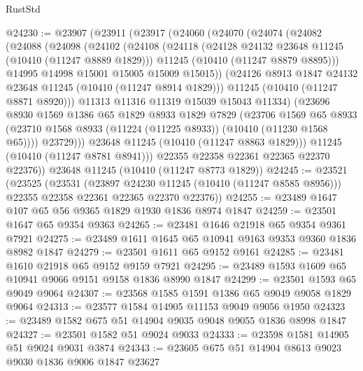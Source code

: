 \begin{lexlean}{RustStd}
\begin{coremodule}
@24230 := @23907
    (@23911
      (@23917
        (@24060
          (@24070
            (@24074
              (@24082
                (@24088
                  (@24098
                    (@24102
                      (@24108
                        (@24118
                          (@24128 @24132 @23648 @11245 (@10410 (@11247 @8889 @1829)))
                          @11245
                          (@10410 (@11247 @8879 @8895)))
                        @14995
                        @14998
                        @15001
                        @15005
                        @15009
                        @15015))
                    (@24126 @8913 @1847 @24132 @23648 @11245 (@10410 (@11247 @8914 @1829)))
                    @11245
                    (@10410 (@11247 @8871 @8920)))
                  @11313
                  @11316
                  @11319
                  @15039
                  @15043
                  @11334)
                (@23696
                  @8930
                  @1569
                  @1386
                  @65
                  @1829
                  @8933
                  @1829
                  @7829
                  (@23706
                    @1569
                    @65
                    @8933
                    (@23710 @1568 @8933 (@11224 (@11225 @8933)) (@10410 (@11230 @1568 @65))))
                  @23729)))
            @23648
            @11245
            (@10410 (@11247 @8863 @1829)))
          @11245
          (@10410 (@11247 @8781 @8941)))
        @22355
        @22358
        @22361
        @22365
        @22370
        @22376))
    @23648
    @11245
    (@10410 (@11247 @8773 @1829))
@24245 := @23521
    (@23525
      (@23531
        (@23897 @24230 @11245 (@10410 (@11247 @8585 @8956)))
        @22355
        @22358
        @22361
        @22365
        @22370
        @22376))
@24255 := @23489 @1647 @107 @65 @56 @9365 @1829 @1930 @1836 @8974 @1847
@24259 := @23501 @1647 @65 @9354 @9363
@24265 := @23481 @1646 @21918 @65 @9354 @9361 @7921
@24275 := @23489 @1611 @1645 @65 @10941 @9163 @9353 @9360 @1836 @8982 @1847
@24279 := @23501 @1611 @65 @9152 @9161
@24285 := @23481 @1610 @21918 @65 @9152 @9159 @7921
@24295 := @23489 @1593 @1609 @65 @10941 @9066 @9151 @9158 @1836 @8990 @1847
@24299 := @23501 @1593 @65 @9049 @9064
@24307 := @23568 @1585 @1591 @1386 @65 @9049 @9058 @1829 @9064
@24313 := @23577 @1584 @14905 @11153 @9049 @9056 @1950
@24323 := @23489 @1582 @675 @51 @14904 @9035 @9048 @9055 @1836 @8998 @1847
@24327 := @23501 @1582 @51 @9024 @9033
@24333 := @23598 @1581 @14905 @51 @9024 @9031 @3874
@24343 := @23605 @675 @51 @14904 @8613 @9023 @9030 @1836 @9006 @1847 @23627

\end{coremodule}
\end{lexlean}
